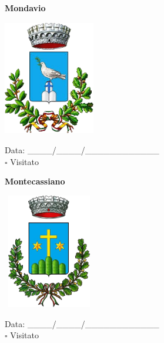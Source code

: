 \documentclass[a5paper,12pt]{article}
\begin{document}
\newpage

\noindent
\begin{minipage}[t]{0.45\textwidth}
    \begin{center}
        \textbf{Mondavio}
    \end{center}
    \vspace{-0.5cm} %
    \begin{center}
        \includegraphics[height= 5cm, width=4cm]{Marche/Stemma Mondavio.png}
    \end{center}
    \vspace{-0.4cm} %
    \begin{flushleft}
        Data: \_\_\_\_/\_\_\_\_/\_\_\_\_\_\_\_\_\_\_\_\_ \\
        $\square$ Visitato
    \end{flushleft}
\end{minipage}
\hfill
\noindent
\begin{minipage}[t]{0.45\textwidth}
    \begin{center}
        \textbf{Montecassiano}
    \end{center}
    \vspace{-0.5cm} %
    \begin{center}
        \includegraphics[height= 5cm, width=4cm]{Marche/Stemma Montecassiano.png}
    \end{center}
    \vspace{-0.4cm} %
    \begin{flushleft}
        Data: \_\_\_\_/\_\_\_\_/\_\_\_\_\_\_\_\_\_\_\_\_ \\
        $\square$ Visitato
    \end{flushleft}
\end{minipage}
\end{document}
